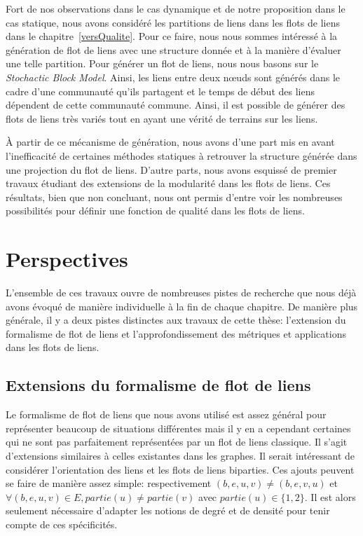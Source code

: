 \bigskip

Fort de nos observations dans le cas dynamique et de notre proposition dans le cas statique, nous avons considéré les partitions de liens dans les flots de liens dans le chapitre~\ref{versQualite}.
Pour ce faire, nous nous sommes intéressé à la génération de flot de liens avec une structure donnée et à la manière d'évaluer une telle partition.
Pour générer un flot de liens, nous nous basons sur le \emph{Stochactic Block Model}.
Ainsi, les liens entre deux n\oe uds sont générés dans le cadre d'une communauté qu'ils partagent et le temps de début des liens dépendent de cette communauté commune.
Ainsi, il est possible de générer des flots de liens très variés tout en ayant une vérité de terrains sur les liens.

\`A partir de ce mécanisme de génération, nous avons d'une part mis en avant l'inefficacité de certaines méthodes statiques à retrouver la structure générée dans une projection du flot de liens.
D'autre parts, nous avons esquissé de premier travaux étudiant des extensions de la modularité dans les flots de liens.
Ces résultats, bien que non concluant, nous ont permis d'entre voir les nombreuses possibilités pour définir une fonction de qualité dans les flots de liens.

\section{Perspectives}

L'ensemble de ces travaux ouvre de nombreuses pistes de recherche que nous déjà avons évoqué de manière individuelle à la fin de chaque chapitre.
De manière plus générale, il y a deux pistes distinctes aux travaux de cette thèse: l'extension du formalisme de flot de liens et l'approfondissement des métriques et applications dans les flots de liens.

\subsection{Extensions du formalisme de flot de liens}

Le formalisme de flot de liens que nous avons utilisé est assez général pour représenter beaucoup de situations différentes mais il y en a cependant certaines qui ne sont pas parfaitement représentées par un flot de liens classique.
Il s'agit d'extensions similaires à celles existantes dans les graphes.
Il serait intéressant de considérer l'orientation des liens et les flots de liens biparties.
Ces ajouts peuvent se faire de manière assez simple: respectivement $(b,e,u,v)\neq (b,e,v,u)$ et $\forall (b,e,u,v) \in E, partie(u)\neq partie(v)$ avec $partie(u) \in \{1,2\}$.
Il est alors seulement nécessaire d'adapter les notions de degré et de densité pour tenir compte de ces spécificités.

